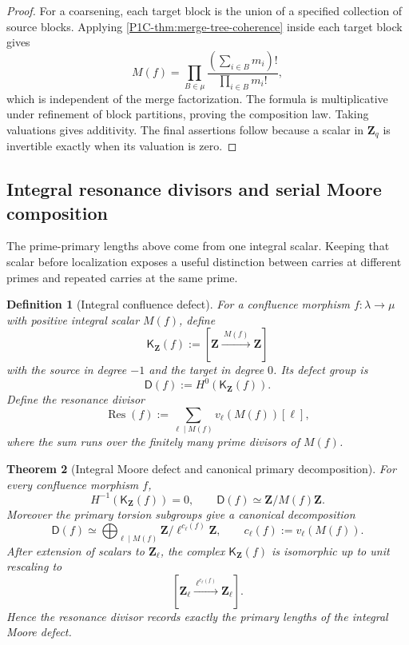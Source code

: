 \documentclass[11pt]{article}
\newtheorem{theorem}{Theorem}[section]
\newtheorem{definition}[theorem]{Definition}
\theoremstyle{remark}
\newcommand{\Z}{\mathbf Z}
\begin{document}
\begin{proof}
For a coarsening, each target block is the union of a specified collection of source blocks.  Applying \cref{P1C-thm:merge-tree-coherence} inside each target block gives
\[
 M(f)=\prod_{B\in\mu}
 \frac{(\sum_{i\in B}m_i)!}{\prod_{i\in B}m_i!},
\]
which is independent of the merge factorization.  The formula is multiplicative under refinement of block partitions, proving the composition law.  Taking valuations gives additivity.  The final assertions follow because a scalar in $\Z_q$ is invertible exactly when its valuation is zero.
\end{proof}

\subsection{Integral resonance divisors and serial Moore composition}

The prime-primary lengths above come from one integral scalar. Keeping that scalar before
localization exposes a useful distinction between carries at different primes and repeated carries
at the same prime.

\begin{definition}[Integral confluence defect]\label{P1C-def:integral-confluence-defect}
For a confluence morphism $f:\lambda\to\mu$ with positive integral scalar $M(f)$, define
\[
 \boxed{
 \mathsf K_{\Z}(f):=[\Z\xrightarrow{\ M(f)\ }\Z]}
\]
with the source in degree $-1$ and the target in degree $0$. Its defect group is
\[
 \mathsf D(f):=H^0(\mathsf K_{\Z}(f)).
\]
Define the resonance divisor
\[
 \boxed{
 \operatorname{Res}(f):=\sum_{\ell\mid M(f)}v_\ell(M(f))[\ell],}
\]
where the sum runs over the finitely many prime divisors of $M(f)$.
\end{definition}

\begin{theorem}[Integral Moore defect and canonical primary decomposition]
\label{P1C-thm:integral-primary-decomposition}
For every confluence morphism $f$,
\[
 H^{-1}(\mathsf K_{\Z}(f))=0,
 \qquad
 \boxed{\mathsf D(f)\simeq\Z/M(f)\Z.}
\]
Moreover the primary torsion subgroups give a canonical decomposition
\[
 \boxed{
 \mathsf D(f)
 \simeq
 \bigoplus_{\ell\mid M(f)}\Z/\ell^{c_\ell(f)}\Z,
 \qquad
 c_\ell(f):=v_\ell(M(f)).}
\]
After extension of scalars to $\Z_\ell$, the complex $\mathsf K_{\Z}(f)$ is isomorphic up to
unit rescaling to
\[
 [\Z_\ell\xrightarrow{\ \ell^{c_\ell(f)}\ }\Z_\ell].
\]
Hence the resonance divisor records exactly the primary lengths of the integral Moore defect.
\end{theorem}
\end{document}
